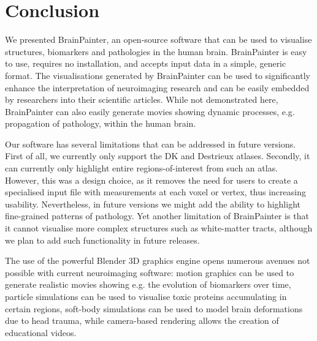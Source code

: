 \documentclass{llncs}
\begin{document}
\section{Conclusion}

We presented BrainPainter, an open-source software that can be used to visualise structures, biomarkers and pathologies in the human brain. BrainPainter is easy to use, requires no installation, and accepts input data in a simple, generic format. The visualisations generated by BrainPainter can be used to significantly enhance the interpretation of neuroimaging research and can be easily embedded by researchers into their scientific articles. While not demonstrated here, BrainPainter can also easily generate movies showing dynamic processes, e.g. propagation of pathology, within the human brain. 

Our software has several limitations that can be addressed in future versions. First of all, we currently only support the DK and Destrieux atlases. Secondly, it can currently only highlight entire regions-of-interest from such an atlas. However, this was a design choice, as it removes the need for users to create a specialised input file with measurements at each voxel or vertex, thus increasing usability. Nevertheless, in future versions we might add the ability to highlight fine-grained patterns of pathology. Yet another limitation of BrainPainter is that it cannot visualise more complex structures such as white-matter tracts, although we plan to add such functionality in future releases. 

The use of the powerful Blender 3D graphics engine opens numerous avenues not possible with current neuroimaging software: motion graphics can be used to generate realistic movies showing e.g. the evolution of biomarkers over time, particle simulations can be used to visualise toxic proteins accumulating in certain regions, soft-body simulations can be used to model brain deformations due to head trauma, while camera-based rendering allows the creation of educational videos. 

% 
% 
\end{document}
